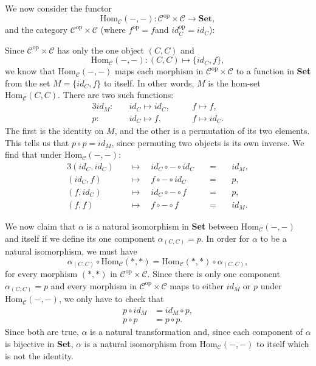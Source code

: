 \documentclass[12pt]{article}
\newcommand{\C}{\mathcal{C}}
\newcommand{\op}{^\text{op}}
\newcommand{\homc}{\text{Hom$_{\C}$}}
\begin{document}
We now consider the functor
\[\homc(-,-): \C\op \times \C \rightarrow \textbf{Set},\]
and the category $\C\op\times\C$ (where $f\op=f$and $id_C\op=id_C$):
\begin{center}
\end{center}
Since $\C\op\times\C$ has only the one object $(C,C)$ and
\[\homc(-,-):(C,C)\mapsto\{id_C, f\},\]
we know that $\homc(-,-)$ maps each morphism in $\C\op\times\C$ to a function in \textbf{Set} from the set $M=\{id_C, f\}$ to itself. In other words, $M$ is the hom-set $\homc(C,C)$. There are two such functions:
\begin{alignat*}{3}
    id_M: &\quad id_C \mapsto id_C, &\quad& f \mapsto f, \\
    p: &\quad id_C \mapsto f, &\quad& f\mapsto id_C.
\end{alignat*}
The first is the identity on $M$, and the other is a permutation of its two elements. This tells us that $p\circ p = id_M$, since permuting two objects is its own inverse. We find that under $\homc(-,-)$:
\begin{alignat*}{3}
    (id_C, id_C)    &\quad\mapsto\quad id_C\circ - \circ id_C    \quad&=&\quad id_M, \\
    (id_C, f)       &\quad\mapsto\quad f\circ - \circ  id_C      \quad&=&\quad p, \\
    (f, id_C)    &\quad\mapsto\quad id_C \circ - \circ  f  \quad&=&\quad p, \\
    (f,f)        &\quad\mapsto\quad f\circ - \circ  f      \quad&=&\quad id_M.
\end{alignat*}

We now claim that $\alpha$ is a natural isomorphism in \textbf{Set} between $\homc(-,-)$ and itself if we define its one component $\alpha_{(C,C)} = p$. In order for $\alpha$ to be a natural isomorphism, we must have
\[\alpha_{(C,C)}\circ\homc(*,*) = \homc(*,*)\circ\alpha_{(C,C)},\]
for every morphism $(*,*)$ in $\C\op\times\C$. Since there is only one component $\alpha_{(C,C)}=p$ and every morphism in $\C\op\times\C$ maps to either $id_M$ or $p$ under $\homc(-,-)$, we only have to check that
\begin{align*}
    p \circ id_M &= id_M \circ p, \\
    p \circ p &= p\circ p.
\end{align*}
Since both are true, $\alpha$ is a natural transformation and, since each component of $\alpha$ is bijective in \textbf{Set}, $\alpha$ is a natural isomorphism from $\homc(-,-)$ to itself which is not the identity.
\end{document}
